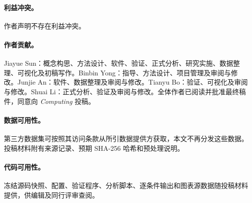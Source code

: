 \documentclass[smallextended]{svjour3}
\begin{document}
\paragraph{利益冲突。}作者声明不存在利益冲突。
\paragraph{作者贡献。}Jiayue Sun：概念构思、方法设计、软件、验证、正式分析、研究实施、数据整理、可视化及初稿写作。Binbin Yong：指导、方法设计、项目管理及审阅与修改。Junjie An：软件、数据整理及审阅与修改。Tianyu Bo：验证、可视化及审阅与修改。Shuai Li：正式分析、验证及审阅与修改。全体作者已阅读并批准最终稿件，同意向 \textit{Computing} 投稿。
\paragraph{数据可用性。}第三方数据集可按照其访问条款从所引数据提供方获取，本文不再分发这些数据。投稿材料附有来源记录、预期 SHA-256 哈希和预处理说明。
\paragraph{代码可用性。}冻结源码快照、配置、验证程序、分析脚本、逐条件输出和图表源数据随投稿材料提供，供编辑及同行评审查阅。

\end{document}
